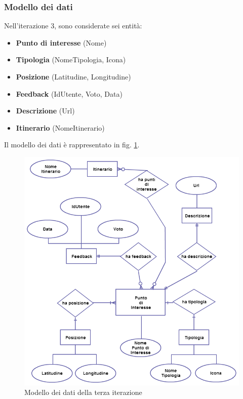 \subsubsection{Modello dei dati}
Nell'iterazione 3, sono considerate sei entità:
\begin{itemize}
\item \textbf{Punto di interesse} (Nome)
\item \textbf{Tipologia} (NomeTipologia, Icona)
\item \textbf{Posizione} (Latitudine, Longitudine)
\item \textbf{Feedback} (IdUtente, Voto, Data)
\item \textbf{Descrizione} (Url)
\item \textbf{Itinerario} (NomeItinerario)
\end{itemize}
Il modello dei dati è rappresentato in fig. \ref{datamodelterzaiterazione}.
\begin{figure}
\includegraphics[scale=0.55]{imgs/model/DataModelTerzaIterazione.png} 
\caption{Modello dei dati della terza iterazione\label{datamodelterzaiterazione}}
\end{figure}

\clearpage

\clearpage{\pagestyle{empty}\cleardoublepage}
